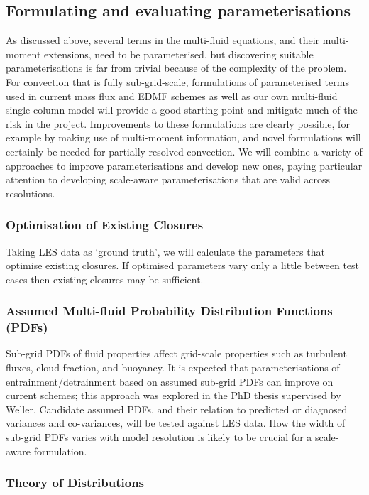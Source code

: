 \documentclass[11pt,a4paper]{article}
\begin{document}
\subsection{Formulating and evaluating parameterisations}
\label{sec:tools}

As discussed above, several terms in the multi-fluid equations, and their multi-moment extensions, need to be parameterised, but discovering suitable parameterisations is far from trivial because of the complexity of the problem.
For convection that is fully sub-grid-scale, formulations of parameterised terms used in current mass flux and EDMF schemes as well as our own multi-fluid single-column model will provide a good starting point and mitigate much of the risk in the project. Improvements to these formulations are clearly possible, for example by making use of multi-moment information, and novel formulations will certainly be needed for partially resolved convection. We will combine a variety of approaches to improve parameterisations and develop new ones, paying particular attention to developing scale-aware parameterisations that are valid across resolutions.

\subsubsection*{Optimisation of Existing Closures}

Taking LES data as `ground truth', we will calculate the parameters that optimise existing closures. If optimised parameters vary only a little between test cases then existing closures may be sufficient.

\subsubsection*{Assumed Multi-fluid Probability Distribution Functions (PDFs)}

Sub-grid PDFs of fluid properties affect grid-scale properties such as turbulent fluxes, cloud fraction, and buoyancy. It is expected that parameterisations of entrainment/detrainment based on assumed sub-grid PDFs can improve on current schemes; this approach was explored in the PhD thesis \cite{McIn20} supervised by Weller. Candidate assumed PDFs, and their relation to predicted or diagnosed variances and co-variances, will be tested against LES data.
How the width of sub-grid PDFs varies with model resolution is likely to be crucial for a scale-aware formulation.

\subsubsection*{Theory of Distributions}
\end{document}
